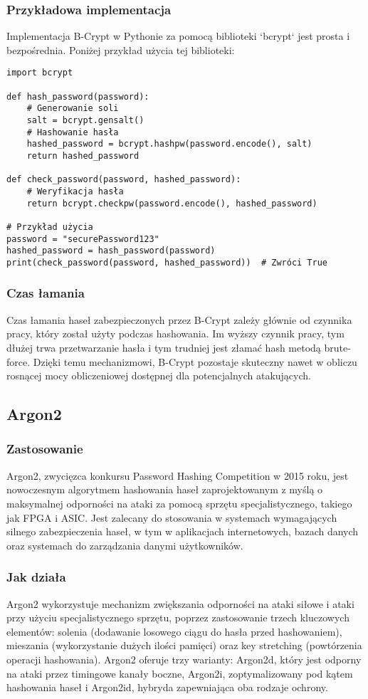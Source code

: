 \documentclass[12pt,a4paper]{article}
\begin{document}
\subsubsection{Przykładowa implementacja}
Implementacja B-Crypt w Pythonie za pomocą biblioteki `bcrypt` jest prosta i bezpośrednia. Poniżej przykład użycia tej biblioteki:

\begin{verbatim}
import bcrypt

def hash_password(password):
    # Generowanie soli
    salt = bcrypt.gensalt()
    # Hashowanie hasła
    hashed_password = bcrypt.hashpw(password.encode(), salt)
    return hashed_password

def check_password(password, hashed_password):
    # Weryfikacja hasła
    return bcrypt.checkpw(password.encode(), hashed_password)

# Przykład użycia
password = "securePassword123"
hashed_password = hash_password(password)
print(check_password(password, hashed_password))  # Zwróci True
\end{verbatim}

\subsubsection{Czas łamania}
Czas łamania haseł zabezpieczonych przez B-Crypt zależy głównie od czynnika pracy, który został użyty podczas hashowania. Im wyższy czynnik pracy, tym dłużej trwa przetwarzanie hasła i tym trudniej jest złamać hash metodą brute-force. Dzięki temu mechanizmowi, B-Crypt pozostaje skuteczny nawet w obliczu rosnącej mocy obliczeniowej dostępnej dla potencjalnych atakujących.


\subsection{Argon2}
\subsubsection{Zastosowanie}
Argon2, zwycięzca konkursu Password Hashing Competition w 2015 roku, jest nowoczesnym algorytmem hashowania haseł zaprojektowanym z myślą o maksymalnej odporności na ataki za pomocą sprzętu specjalistycznego, takiego jak FPGA i ASIC. Jest zalecany do stosowania w systemach wymagających silnego zabezpieczenia haseł, w tym w aplikacjach internetowych, bazach danych oraz systemach do zarządzania danymi użytkowników.

\subsubsection{Jak działa}
Argon2 wykorzystuje mechanizm zwiększania odporności na ataki siłowe i ataki przy użyciu specjalistycznego sprzętu, poprzez zastosowanie trzech kluczowych elementów: solenia (dodawanie losowego ciągu do hasła przed hashowaniem), mieszania (wykorzystanie dużych ilości pamięci) oraz key stretching (powtórzenia operacji hashowania). Argon2 oferuje trzy warianty: Argon2d, który jest odporny na ataki przez timingowe kanały boczne, Argon2i, zoptymalizowany pod kątem hashowania haseł i Argon2id, hybryda zapewniająca oba rodzaje ochrony.
\end{document}
